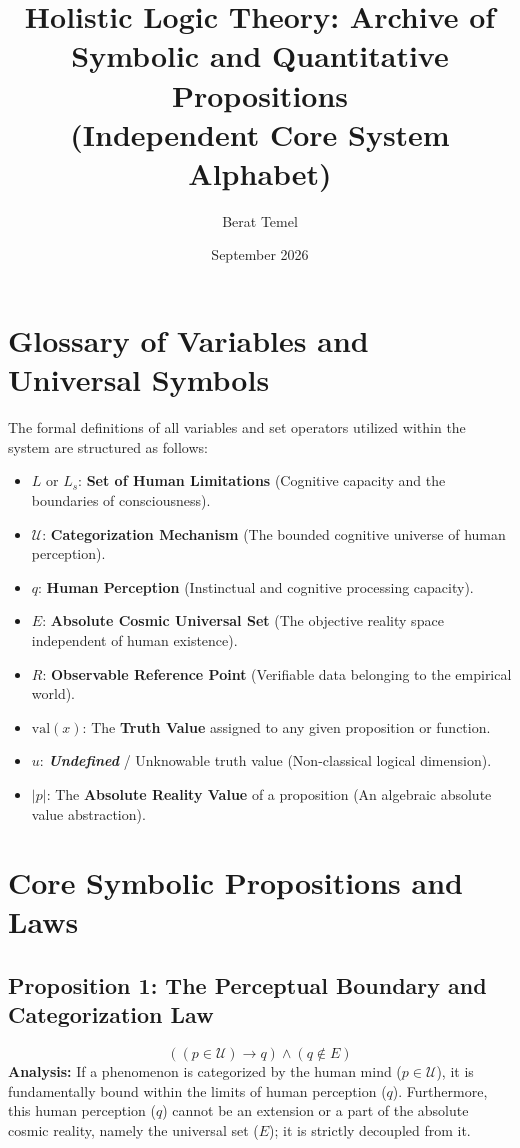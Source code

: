 \documentclass{article}
\title{Holistic Logic Theory: Archive of Symbolic and Quantitative Propositions \\ \large (Independent Core System Alphabet)}
\author{Berat Temel}
\date{September 2026}
\begin{document}
\maketitle

\section{Glossary of Variables and Universal Symbols}
The formal definitions of all variables and set operators utilized within the system are structured as follows:
\begin{itemize}
    \item $L$ or $L_s$: \textbf{Set of Human Limitations} (Cognitive capacity and the boundaries of consciousness).
    \item $\mathcal{U}$: \textbf{Categorization Mechanism} (The bounded cognitive universe of human perception).
    \item $q$: \textbf{Human Perception} (Instinctual and cognitive processing capacity).
    \item $E$: \textbf{Absolute Cosmic Universal Set} (The objective reality space independent of human existence).
    \item $R$: \textbf{Observable Reference Point} (Verifiable data belonging to the empirical world).
    \item $\text{val}(x)$: The \textbf{Truth Value} assigned to any given proposition or function.
    \item $u$: \textbf{\textit{Undefined}} / Unknowable truth value (Non-classical logical dimension).
    \item $|p|$: The \textbf{Absolute Reality Value} of a proposition (An algebraic absolute value abstraction).
\end{itemize}

\section{Core Symbolic Propositions and Laws}

\subsection{Proposition 1: The Perceptual Boundary and Categorization Law}
\[ ((p \in \mathcal{U}) \rightarrow q) \land (q \notin E) \]
\textbf{Analysis:} If a phenomenon is categorized by the human mind ($p \in \mathcal{U}$), it is fundamentally bound within the limits of human perception ($q$). Furthermore, this human perception ($q$) cannot be an extension or a part of the absolute cosmic reality, namely the universal set ($E$); it is strictly decoupled from it.
\end{document}
